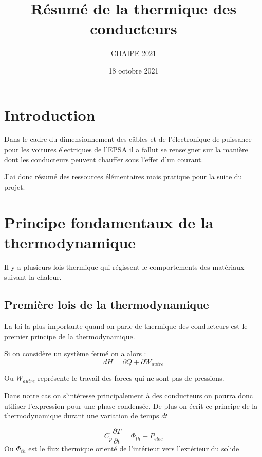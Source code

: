 \documentclass[12pt,a4paper]{article}
\author{CHAIPE 2021}
\title{Résumé de la thermique des conducteurs}
\date{18 octobre 2021}
\begin{document}
\maketitle

\tableofcontents

\newpage

\section{Introduction}

Dans le cadre du dimensionnement des câbles et de l'électronique de puissance pour les voitures électriques de l'EPSA il a fallut se renseigner sur la manière dont les conducteurs peuvent chauffer sous l'effet d'un courant.

J'ai donc résumé des ressources élémentaires mais pratique pour la suite du projet. 

\section{ Principe fondamentaux de la thermodynamique }

Il y a plusieurs lois thermique qui régissent le comportements des matériaux suivant la chaleur. 

\subsection{Première lois de la thermodynamique}

La loi la plus importante quand on parle de thermique des conducteurs est le premier principe de la thermodynamique.

Si on considère un système fermé on a alors :
\begin{equation*}
dH = \partial Q + \partial W_{autre}
\end{equation*}

Ou $W_{autre}$ représente le travail des forces qui ne sont pas de pressions. 

Dans notre cas on s'intéresse principalement à des conducteurs on pourra donc utiliser l'expression pour une phase condensée. De plus on écrit ce principe de la thermodynamique durant une variation de temps $dt$

\begin{equation}
C_p \frac{\partial T}{\partial t} = \Phi_{th} + P_{elec}
\end{equation}
Ou $\Phi_{th}$ est le flux thermique orienté de l'intérieur vers l'extérieur du solide
\end{document}
